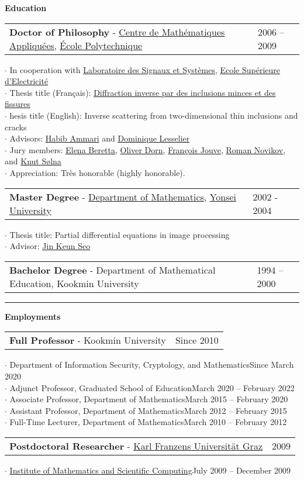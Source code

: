\documentclass[10pt,A4]{article}
\newcommand{\cvsection}[1]
{
	\begin{center}
		\large\textcolor{sectcol}{\textbf{#1}}
	\end{center}
}
\newcommand{\cveventthree}[3]
{

\begin{tabular*}{1\textwidth}{p{13.6cm}  x{3.9cm}}
	\textbf{#2} - \textcolor{bgcol}{#3} &   \vspace{2.5pt}\textcolor{sectcol}{#1}
\end{tabular*}

}
\newcommand{\cveventfour}[4]
{

\begin{tabular*}{1\textwidth}{p{13.6cm}  x{3.9cm}}
	\textbf{#2} - \textcolor{bgcol}{#3} &   \vspace{2.5pt}\textcolor{sectcol}{#1}
\end{tabular*}


  $\cdot$ #4\\[3pt]
}
\newcommand{\cvevent}[5]
{

\begin{tabular*}{1\textwidth}{p{13.6cm}  x{3.9cm}}
	\textbf{#2} - \textcolor{bgcol}{#3} &   \vspace{2.5pt}\textcolor{sectcol}{#1}
\end{tabular*}


  $\cdot$ #4\\[3pt]
  $\cdot$ #5\\[6pt]

}
\newcommand{\cveventeight}[8]
{

\begin{tabular*}{1\textwidth}{p{13.6cm}  x{3.9cm}}
	\textbf{#2} - \textcolor{bgcol}{#3} &   \vspace{2.5pt}\textcolor{sectcol}{#1}
\end{tabular*}


  $\cdot$ #4\\[3pt]
  $\cdot$ #5\\[3pt]
  $\cdot$ #6\\[3pt]
  $\cdot$ #7\\[3pt]
  $\cdot$ #8\\[6pt]

}
\newcommand{\cveventnine}[9]
{

\begin{tabular*}{1\textwidth}{p{13.6cm}  x{3.9cm}}
	\textbf{#2} - \textcolor{bgcol}{#3} &   \vspace{2.5pt}\textcolor{sectcol}{#1}
\end{tabular*}


  $\cdot$ #4\\[3pt]
  $\cdot$ #5\\[3pt]
  $\cdot$ #6\\[3pt]
  $\cdot$ #7\\[3pt]
  $\cdot$ #8\\[3pt]
  $\cdot$ #9\\[6pt]

}
\begin{document}
%
%

\cvsection{Education}

\cveventnine{2006 -- 2009}{Doctor of Philosophy}{\href{http://www.cmap.polytechnique.fr/}{Centre de Math\'ematiques Appliqu\'ees}, \href{http://www.polytechnique.fr/}{\'Ecole Polytechnique}}{In cooperation with \href{http://www.l2s.CentraleSup{\'e}lec.fr/}{Laboratoire des Signaux et Syst\`emes}, \href{http://www.CentraleSup{\'e}lec.fr/}{Ecole Sup\'erieure d'Electricit\'e}}{Thesis title (Fran\c{c}ais): \href{https://tel.archives-ouvertes.fr/pastel-00004834/}{Diffraction inverse par des inclusions minces et des fissures}}{hesis title (English): Inverse scattering from two-dimensional thin inclusions and cracks}{Advisors: \href{https://people.math.ethz.ch/~hammari/}{Habib Ammari} and \href{http://webpages.lss.supelec.fr/perso/lesselier/}{Dominique Lesselier}}{Jury members: \href{https://sites.google.com/view/eberetta/home}{Elena Beretta}, \href{https://cpg.kfupm.edu.sa/bio/dr-oliver-dorn/}{Oliver Dorn}, \href{http://www.cmapx.polytechnique.fr/~jouve}{Fran\c{c}ois Jouve}, \href{http://www.cmapx.polytechnique.fr/~novikov/}{Roman Novikov}, and \href{https://www.math.uci.edu/~ksolna/}{Knut S\o lna}}{Appreciation: Tr\`es honorable (highly honorable).}
%
\cvevent{2002 - 2004}{Master Degree}{\href{http://math.yonsei.ac.kr/}{Department of Mathematics}, \href{http://www.yonsei.ac.kr/}{Yonsei University}}{Thesis title: Partial differential equations in image processing}{Advisor: \href{http://www.seojinkeun.com}{Jin Keun Seo}}
%
\cveventthree{1994 -- 2000}{Bachelor Degree}{Department of Mathematical Education, Kookmin University}

\textcolor{softcol}{\hrule}

\cvsection{Employments}

\cveventeight{Since 2010}{Full Professor}{Kookmin University}{Department of Information Security, Cryptology, and Mathematics\hfill Since March 2020}{Adjunct Professor, Graduated School of Education\hfill March 2020 -- February 2022}{Associate Professor, Department of Mathematics\hfill March 2015 -- February 2020}{Assistant Professor, Department of Mathematics\hfill March 2012 -- February 2015}{Full-Time Lecturer, Department of Mathematics\hfill March 2010 -- February 2012}
\cveventfour{2009}{Postdoctoral Researcher}{\href{https://www.uni-graz.at/en/}{Karl Franzens Universit{\"a}t Graz}}{\href{https://mathematik.uni-graz.at/en/}{Institute of Mathematics and Scientific Computing}\hfill July 2009 -- December 2009}
\end{document}
